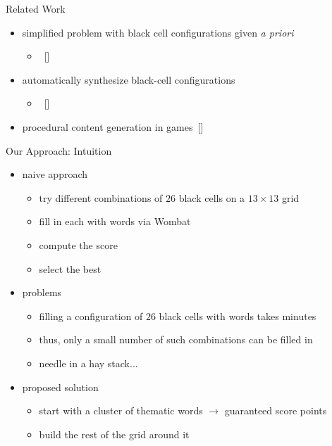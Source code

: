 \documentclass[aspectratio=169,usenames,dvipsnames]{beamer}
\newcommand{\tcb}[1]{\textcolor{m1}{#1}}
\newcommand{\tcg}[1]{\textcolor{m5}{#1}}
\newcommand{\tcm}[1]{\textcolor{m7}{#1}}
\newcommand{\bei}{\begin{itemize}}
\newcommand{\eei}{\end{itemize}}
\newcommand{\ie}{\item}
\numberwithin{equation}{section}
\numberwithin{theorem}{section}
\numberwithin{lem}{section}
\numberwithin{df}{section}
\begin{document}

\begin{frame}{Related Work}

\bei

\ie simplified problem with black cell configurations given \emph{a priori} 
\bei
\ie~[\cite{DBLP:conf/socs/BoteaB21,Botea_Bulitko_2022}]
\eei

\bigskip

\ie automatically synthesize black-cell configurations
\bei
\ie~[\cite{DBLP:conf/cig/BulitkoB21}]
\eei

\bigskip
\bigskip

\ie procedural content generation in games~[\cite{togelius2013procedural,risi2017neuroevolution,exag2017,exag2018,9231576,darwinDemons,8718565}]


\eei

\end{frame}


\begin{frame}{Our Approach: Intuition}

\bei

\ie \tcb{naive approach} 
\bei 
\ie try different combinations of $26$ black cells on a $13 \times 13$ grid
\ie fill in each with words via {\sc Wombat}
\ie compute the score
\ie select the best
\eei

\bigskip

\ie \tcm{problems}
\bei
\ie filling a configuration of $26$ black cells with words takes minutes
\ie thus, only a small number of such combinations can be filled in
\ie needle in a hay stack...
\eei

\bigskip

\ie \tcg{proposed solution}
\bei
\ie start with a cluster of thematic words $\to$ guaranteed score points
\ie build the rest of the grid around it
\eei

\eei

\end{frame}




\end{document}
